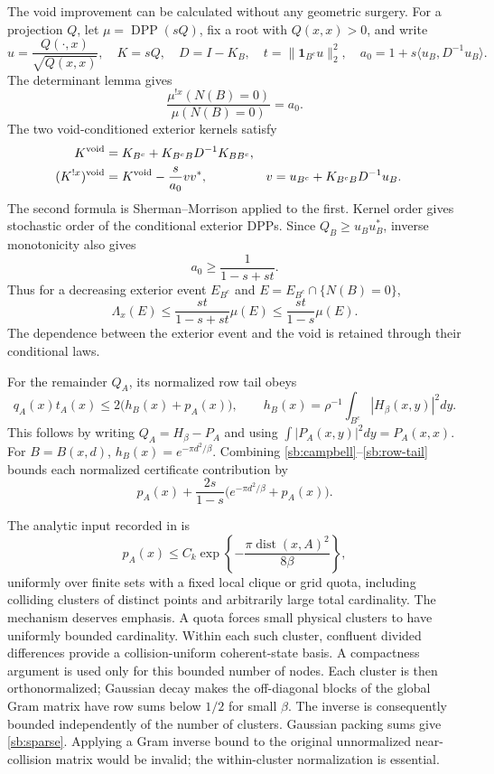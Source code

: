 \documentclass[11pt,a4paper]{article}
\theoremstyle{definition}
\theoremstyle{remark}
\numberwithin{equation}{section}
\begin{document}
The void improvement can be calculated without any geometric surgery.
For a projection $Q$, let $\mu=\operatorname{DPP}(sQ)$, fix a root
with $Q(x,x)>0$, and write
\[
 u=\frac{Q(\cdot,x)}{\sqrt{Q(x,x)}},\quad
 K=sQ,\quad D=I-K_B,\quad t=\|\mathbf1_{B^c}u\|_2^2,
 \quad a_0=1+s\langle u_B,D^{-1}u_B\rangle.
\]
The determinant lemma gives
\[
 \frac{\mu^{!x}(N(B)=0)}{\mu(N(B)=0)}=a_0.
\]
The two void-conditioned exterior kernels satisfy
\begin{align*}
 K^{\rm void}&=K_{B^c}+K_{B^cB}D^{-1}K_{BB^c},\\
 (K^{!x})^{\rm void}&=K^{\rm void}-\frac{s}{a_0}vv^*,
 &v&=u_{B^c}+K_{B^cB}D^{-1}u_B.
\end{align*}
The second formula is Sherman--Morrison applied to the first. Kernel
order gives stochastic order of the conditional exterior DPPs. Since
$Q_B\ge u_Bu_B^*$, inverse monotonicity also gives
\[
 a_0\ge\frac1{1-s+st}.
\]
Thus for a decreasing exterior event $E_{B^c}$ and
$E=E_{B^c}\cap\{N(B)=0\}$,
\begin{equation}
 \Lambda_x(E)\le\frac{st}{1-s+st}\mu(E)
                  \le\frac{st}{1-s}\mu(E).
 \label{sb:void-improvement}
\end{equation}
The dependence between the exterior event and the void is retained
through their conditional laws.

For the remainder $Q_A$, its normalized row tail obeys
\begin{equation}
 q_A(x)t_A(x)\le2\bigl(h_B(x)+p_A(x)\bigr),
 \qquad
 h_B(x)=\rho^{-1}\int_{B^c}|H_\beta(x,y)|^2dy.
 \label{sb:row-tail}
\end{equation}
This follows by writing $Q_A=H_\beta-P_A$ and using
$\int|P_A(x,y)|^2dy=P_A(x,x)$. For $B=B(x,d)$,
$h_B(x)=e^{-\pi d^2/\beta}$. Combining
\eqref{sb:campbell}--\eqref{sb:row-tail} bounds each normalized
certificate contribution by
\begin{equation}
 p_A(x)+\frac{2s}{1-s}\bigl(e^{-\pi d^2/\beta}+p_A(x)\bigr).
 \label{sb:certificate-contribution}
\end{equation}

The analytic input recorded in  is
\begin{equation}
 p_A(x)\le C_k\exp\left\{-\frac{\pi\operatorname{dist}(x,A)^2}
                                      {8\beta}\right\},
 \label{sb:sparse}
\end{equation}
uniformly over finite sets with a fixed local clique or grid quota,
including colliding clusters of distinct points and arbitrarily large
total cardinality. The mechanism deserves emphasis. A quota forces
small physical clusters to have uniformly bounded cardinality.
Within each such cluster, confluent divided differences provide a
collision-uniform coherent-state basis. A compactness argument is used
only for this bounded number of nodes. Each cluster is then
orthonormalized; Gaussian decay makes the off-diagonal blocks of the
global Gram matrix have row sums below $1/2$ for small $\beta$.
The inverse is consequently bounded independently of the number of
clusters. Gaussian packing sums give \eqref{sb:sparse}. Applying a
Gram inverse bound to the original unnormalized near-collision matrix
would be invalid; the within-cluster normalization is essential.
\end{document}
